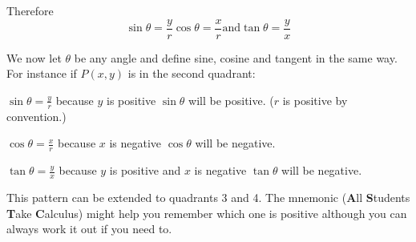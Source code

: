 Therefore
\begin{equation*}\sin  \theta  =\frac{y}{r}\text{}\cos  \theta  =\frac{x}{r}\text{and}\tan  \theta  =\frac{y}{x}
\end{equation*}

We now let $\theta $ be any angle and define sine, cosine and tangent in the same way. For instance
if $P (x ,y)$ is in the second quadrant: 

   
\setlength\fboxrule{0in}\setlength\fboxsep{0.2in}


$\sin  \theta  =\frac{y}{r}$ because $y$ is positive $\sin  \theta $ will be positive. ($r$ is positive by convention.) 

$\cos  \theta  =\frac{x}{r}$ because $x$ is negative $\cos  \theta $ will be negative. 

$\tan  \theta  =\frac{y}{x}$ because $y$ is positive and $x$ is negative $\tan  \theta $ will be negative. 

This pattern can be extended to quadrants 3 and 4. The
mnemonic (\textbf{A}ll \textbf{S}tudents \textbf{T}ake \textbf{C}alculus) might help you remember which one is positive
although you can always work it out if you need to. 

